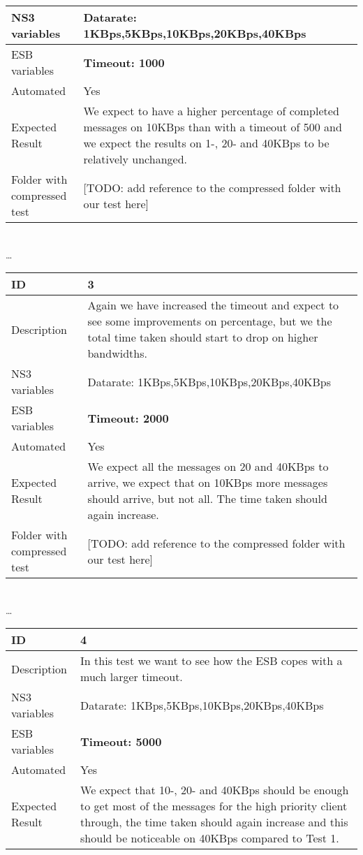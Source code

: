 \begin{center}
\begin{tabular}{| p{4cm} | p{8cm} |}
\hline
NS3 variables & Datarate: 1KBps,5KBps,10KBps,20KBps,40KBps \\
\hline
ESB variables & \textbf{Timeout: 1000} \\
\hline
Automated & Yes \\
\hline
Expected Result & We expect to have a higher percentage of completed messages on 10KBps than with a timeout of 500 and we expect the results on 1-, 20- and 40KBps to be relatively unchanged. \\
\hline
Folder with compressed test & [TODO: add reference to the compressed folder with our test here]\\
\hline
\end{tabular}
\\ \ldots \\
\begin{tabular}{| p{4cm} | p{8cm} |}%
\hline
ID & 3 \\
\hline
Description & Again we have increased the timeout and expect to see some improvements on percentage, but we the total time taken should start to drop on higher bandwidths.  \\
\hline
NS3 variables & Datarate: 1KBps,5KBps,10KBps,20KBps,40KBps \\
\hline
ESB variables & \textbf{Timeout: 2000} \\
\hline
Automated & Yes \\
\hline
Expected Result & We expect all the messages on 20 and 40KBps to arrive, we expect that on 10KBps more messages should arrive, but not all. The time taken should again increase. \\
\hline
Folder with compressed test & [TODO: add reference to the compressed folder with our test here]\\
\hline
\end{tabular}
\\ \ldots \\
\begin{tabular}{| p{4cm} | p{8cm} |}%
\hline
ID & 4 \\
\hline
Description & In this test we want to see how the ESB copes with a much larger timeout.  \\
\hline
NS3 variables & Datarate: 1KBps,5KBps,10KBps,20KBps,40KBps \\
\hline
ESB variables & \textbf{Timeout: 5000} \\
\hline
Automated & Yes \\
\hline
Expected Result & We expect that 10-, 20- and 40KBps should be enough to get most of the messages for the high priority client through, the time taken should again increase and this should be noticeable on 40KBps compared to Test 1.  \\

\end{tabular}
\end{center}
